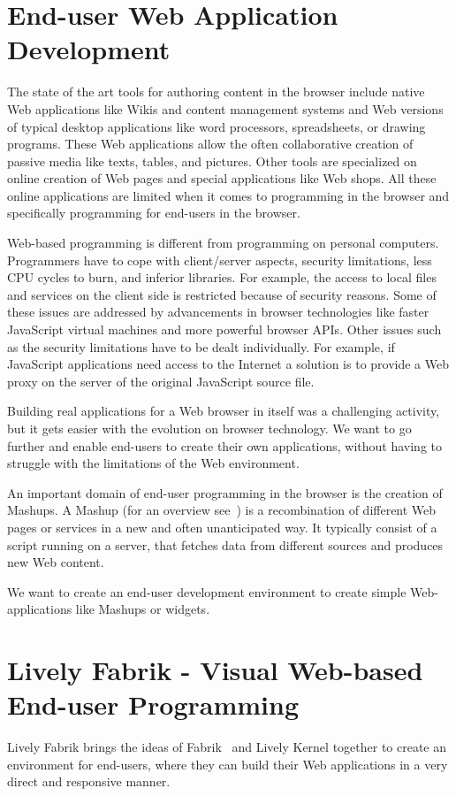 \documentclass[pdftex, times, 10pt, twocolumn]{article}
\begin{document}
\section{End-user Web Application Development}
The state of the art tools for authoring content in the browser include native Web applications like Wikis and content management systems and Web versions of typical desktop applications like word processors, spreadsheets, or drawing programs. These Web applications allow the often collaborative creation of passive media like texts, tables, and pictures. Other tools are specialized on online creation of Web pages and special applications like Web shops. All these online applications are limited when it comes to programming in the browser and specifically programming for end-users in the browser. 

Web-based programming is different from programming on personal computers. Programmers have to cope with client/server aspects, security limitations, less CPU cycles to burn, and inferior libraries. For example, the access to local files and services on the client side is restricted because of security reasons. Some of these issues are addressed by advancements in browser technologies like faster JavaScript virtual machines and more powerful browser APIs. Other issues such as the security limitations have to be dealt individually. For example, if JavaScript applications need access to the Internet a solution is to provide a Web proxy on the server of the original JavaScript source file.   

Building real applications for a Web browser in itself was a challenging activity, but it gets easier with the evolution on browser technology. We want to go further and enable end-users to create their own applications, without having to struggle with the limitations of the Web environment. 

An important domain of end-user programming in the browser is the creation of Mashups.  A Mashup (for an overview see~\cite{Merrill2006MNB}) is a recombination of different Web pages or services in a new and often unanticipated way. It typically consist of a script running on a server, that fetches data from different sources and produces new Web content.  

We want to create an end-user development environment to create simple Web-applications like Mashups or widgets.   



\section{Lively Fabrik - Visual Web-based End-user Programming}
Lively Fabrik brings the ideas of Fabrik~\cite{Ingalls1988FVP,Ludolph1988FPE} and Lively Kernel together to create an environment for end-users, where they can build their Web applications in a very direct and responsive manner.  
\end{document}
